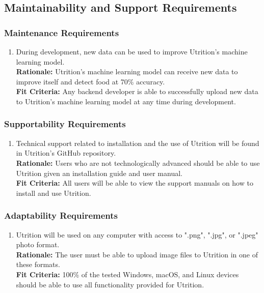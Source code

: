 \documentclass[12pt]{article}
\begin{document}
\subsection{Maintainability and Support Requirements}

\subsubsection{Maintenance Requirements}
\begin{enumerate}[{MS}1. ] 
	\item During development, new data can be used to improve Utrition’s machine learning model.\\
	\textbf{Rationale:} Utrition’s machine learning model can receive new data to improve itself and detect food at 70\% accuracy.\\	
	\textbf{Fit Criteria:} Any backend developer is able to successfully upload new data to Utrition’s machine learning model at any time during development. 
\end{enumerate}

\subsubsection{Supportability Requirements}
\begin{enumerate}[{MS}2. ] 
	\item Technical support related to installation and the use of Utrition will be found in Utrition’s GitHub repository. \\
	\textbf{Rationale:} Users who are not technologically advanced should be able to use Utrition given an installation guide and user manual.\\	
	\textbf{Fit Criteria:} All users will be able to view the support manuals on how to install and use Utrition.
\end{enumerate}

\subsubsection{Adaptability Requirements}
\begin{enumerate}[{MS}3. ] 
	\item Utrition will be used on any computer with access to ".png", ".jpg", or ".jpeg" photo format.\\
	\textbf{Rationale:} The user must be able to upload image files to Utrition in one of these formats. \\
	\textbf{Fit Criteria:} 100\% of the tested Windows, macOS, and Linux devices should be able to use all functionality provided for Utrition.
\end{enumerate}
\end{document}
